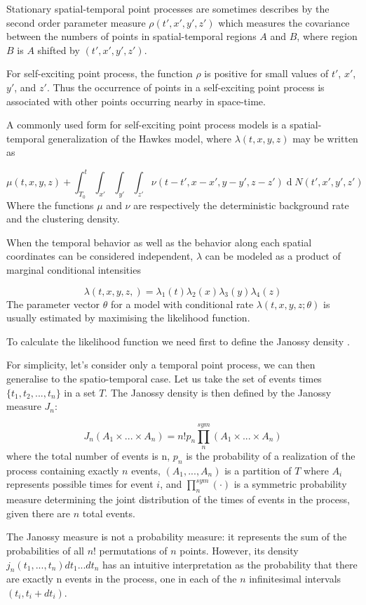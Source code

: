 \documentclass[11pt,a4paper]{article}
\renewcommand{\d}[1]{\ensuremath{\operatorname{d}\!{#1}}}
\begin{document}
Stationary spatial-temporal point processes are sometimes describes by the second order parameter measure $\rho(t', x', y', z')$ which measures the covariance between the numbers of points in spatial-temporal regions $A$ and $B$, where region $B$ is $A$ shifted by $(t', x', y', z')$.

For self-exciting point process, the function $\rho$ is positive for small values of $t'$, $x'$, $y'$, and $z'$. Thus the occurrence of points in a self-exciting point process is associated with other points occurring nearby in space-time.

A commonly used form for self-exciting point process models is a spatial-temporal generalization of the Hawkes model, where $\lambda(t,x,y,z)$ may be written as

\[
\mu(t,x,y,z) + \int_{T_{0}}^{t} \int_{x'} \int_{y'} \int_{z'} \nu (t-t', x-x', y-y', z-z') \d N (t', x', y', z')
\]
Where the functions $\mu$ and $\nu$ are respectively the deterministic background rate and the clustering density.

When the temporal behavior as well as the behavior along each spatial coordinates can be considered independent, $\lambda$ can be modeled as a product of marginal conditional intensities 

\[
\lambda(t,x,y,z,) = \lambda_{1}(t) \lambda_{2}(x) \lambda_{3}(y) \lambda_{4}(z)
\]
The parameter vector $\theta$ for a model with conditional rate $\lambda (t, x, y, z; \theta)$ is usually estimated by maximising the likelihood function.

To calculate the likelihood function we need first to define the Janossy density \cite{Reinhart}. 

For simplicity, let's consider only a temporal point process, we can then generalise to the spatio-temporal case.
Let us take the set of events times $\{t_{1}, t_{2},  ... , t_{n} \}$ in a set $T$. The Janossy density is then defined by the Janossy measure $J_{n}$:

\[
J_{n}(A_{1} \times ... \times A_{n}) = n! p_{n} \prod_{n}^{sym} (A_{1} \times ... \times A_{n})
\]
where the total number of events is n, $p_{n}$ is the probability of a realization of the process containing exactly $n$ events, $(A_{1}, . . . , A_{n})$ is a partition of $T$ where $A_{i}$ represents possible times for event $i$, and $\prod_{n}^{sym}(\cdot)$ is a symmetric probability measure determining the joint distribution of the times of events in the process, given there are $n$ total events.

The Janossy measure is not a probability measure: it represents the sum of the probabilities of all $n!$ permutations of $n$ points. However, its density $j_{n}(t_{1}, . . . , t_{n}) dt_{1} ... dt_{n}$ has an intuitive interpretation as the probability that there are exactly n events in the process, one in each of the $n$ infinitesimal intervals $(t_{i}, t_{i} + dt_{i})$.
\end{document}
